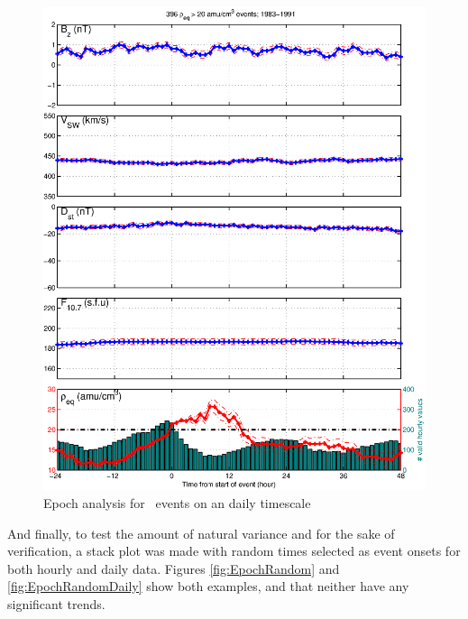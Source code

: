 \begin{figure}[htp!]
	\centering
	\includegraphics[width=1\linewidth]{Figures/StormAvs/stormavs-mass-gt20-GOES6}
	\caption{Epoch analysis for \req\ events on an daily timescale}
	\label{fig:EpochRho}
\end{figure}

And finally, to test the amount of natural variance and for the sake of verification, a stack plot was made with random times selected as event onsets for both hourly and daily data. Figures \ref{fig:EpochRandom} and \ref{fig:EpochRandomDaily} show both examples, and that neither have any significant trends.

